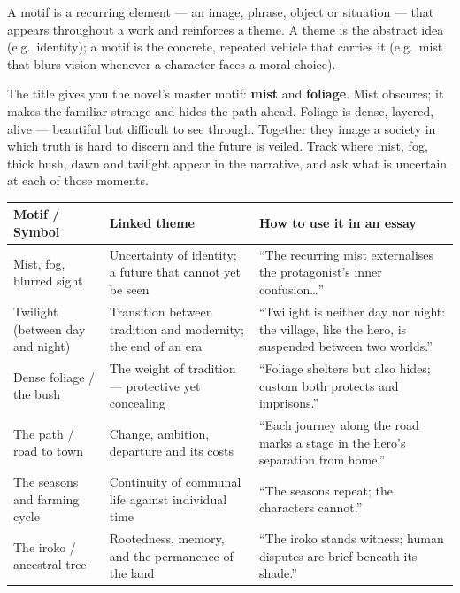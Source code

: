 \documentclass[11pt]{article}
\newcommand{\cle}[1]{{\popxbold\color{popdark}#1}}
\newcounter{popsec}
\newcounter{popsub}
\newcommand{\courssub}[1]{%
  \stepcounter{popsub}%
  \par\vspace{9pt}\noindent{\popxbold\fontsize{11.5}{13}\selectfont\color{popink}{\color{poporange}\thepopsec.\thepopsub}\hspace{6pt}#1}\par\nopagebreak\vspace{4pt}
}
\begin{document}
\courssub{Themes, Symbols and Motifs}

\begin{definition}[Motif]
A \cle{motif} is a recurring element — an image, phrase, object or situation — that appears throughout a work and reinforces a \cle{theme}. A theme is the abstract idea (e.g.\ identity); a motif is the concrete, repeated vehicle that carries it (e.g.\ mist that blurs vision whenever a character faces a moral choice).
\end{definition}

The title gives you the novel's master motif: \textbf{mist} and \textbf{foliage}. Mist obscures; it makes the familiar strange and hides the path ahead. Foliage is dense, layered, alive — beautiful but difficult to see through. Together they image a society in which truth is hard to discern and the future is veiled. Track where mist, fog, thick bush, dawn and twilight appear in the narrative, and ask what is uncertain at each of those moments.

\begin{center}
\begin{tabularx}{\linewidth}{|l|X|X|}
\hline
\rowcolor{popblueL} \textbf{Motif / Symbol} & \textbf{Linked theme} & \textbf{How to use it in an essay} \\
\hline
Mist, fog, blurred sight & Uncertainty of identity; a future that cannot yet be seen & ``The recurring mist externalises the protagonist's inner confusion\ldots'' \\
\hline
Twilight (between day and night) & Transition between tradition and modernity; the end of an era & ``Twilight is neither day nor night: the village, like the hero, is suspended between two worlds.'' \\
\hline
Dense foliage / the bush & The weight of tradition — protective yet concealing & ``Foliage shelters but also hides; custom both protects and imprisons.'' \\
\hline
The path / road to town & Change, ambition, departure and its costs & ``Each journey along the road marks a stage in the hero's separation from home.'' \\
\hline
The seasons and farming cycle & Continuity of communal life against individual time & ``The seasons repeat; the characters cannot.'' \\
\hline
The iroko / ancestral tree & Rootedness, memory, and the permanence of the land & ``The iroko stands witness; human disputes are brief beneath its shade.'' \\
\hline
\end{tabularx}
\end{center}
\end{document}

